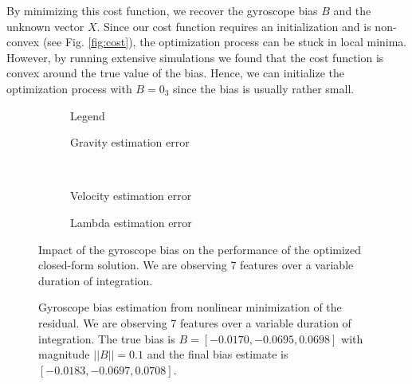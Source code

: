 \documentclass[letterpaper, 10pt, conference, final]{ieeeconf}  %
\begin{document}
By minimizing this cost function, we recover the gyroscope bias $B$ and the unknown vector $X$.
Since our cost function requires an initialization and is non-convex (see Fig. \ref{fig:cost}),
the optimization process can be stuck in local minima.
However, by running extensive simulations we found that the cost function is convex around the true value of the bias. Hence, we can initialize the optimization process with $B = 0_3$ since the bias is usually rather small.



\begin{figure}
  \centering
        \hspace{0.2\columnwidth}%
        \begin{subfigure}[b]{0.3\columnwidth}
                \resizebox{\columnwidth}{!}{}
                \caption{Legend}

        \end{subfigure}%
        \begin{subfigure}[b]{0.5\columnwidth}
                \resizebox{\columnwidth}{!}{}
                \caption{Gravity estimation error}

        \end{subfigure}
        ~
        \begin{subfigure}[b]{0.5\columnwidth}
                \resizebox{\columnwidth}{!}{}
                \caption{Velocity estimation error}

        \end{subfigure}%
        \begin{subfigure}[b]{0.5\columnwidth}
                \resizebox{\columnwidth}{!}{}
                \caption{Lambda estimation error}

        \end{subfigure}
        \caption{Impact of the gyroscope bias on the performance of the optimized closed-form solution. We are observing 7 features  over a variable duration of integration. \label{fig:biasGyroOpt}}
\end{figure}

\begin{figure}
  \centering
  \resizebox{\columnwidth}{!}{}
  \caption{Gyroscope bias estimation from nonlinear minimization of the residual.
    We are observing 7 features over a variable duration of integration.
    The true bias is $B=[-0.0170, -0.0695, 0.0698]$ with magnitude $||B||=0.1$ and the final bias estimate is $[-0.0183, -0.0697, 0.0708]$.\label{fig:gBiasEstimate}}
\end{figure}
\end{document}
